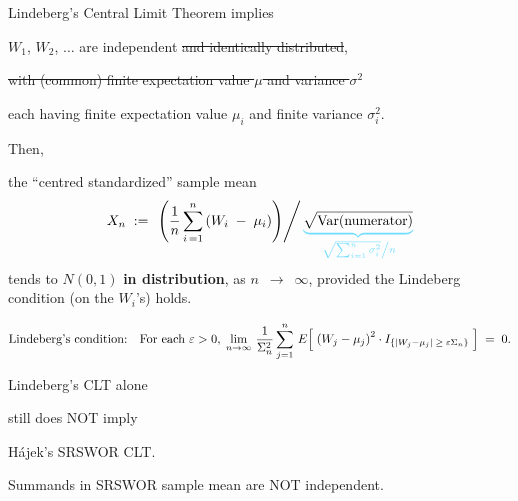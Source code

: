 \begin{frame}{\LARGE Lindeberg's Central Limit Theorem {\large\color{gcblue}implies}}

$W_{1}$, \;$W_{2}$, \;$\ldots$\; are independent {\color{faintblue}\sout{and identically distributed}},

{\color{faintblue}\sout{with (common) finite expectation value $\mu$ and variance $\sigma^{2}$}}

each having finite expectation value $\mu_{i}$ and finite variance $\sigma_{i}^{2}$.

\vskip 0.2cm
Then,
\large
\begin{center}
the ``centred standardized'' sample mean
\begin{equation*}
	X_{n} \;:=\;
	\left.\left(\dfrac{1}{n}\,\overset{n}{\underset{i\,=1}{\sum}}\,(W_{i}\;-\;\mu_{i})\right)\right\slash
	{\color{faintblue}
		\underset
			{\left.\sqrt{\sum_{i=1}^{n}\sigma_{i}^{2}}\right\slash n}
			{\underbrace{\color{black}\sqrt{\Var(\textnormal{numerator})}}}
	}
\end{equation*}
\vskip -0.2cm
tends to $N(0,1)$ {\color{gcblue}\textbf{in distribution}},\; as \;$n$ \,$\longrightarrow$\, $\infty$,
\vskip 0.1cm
provided \pause the {\color{red}Lindeberg condition} (on the $W_{i}$'s) holds.
\end{center}

\vskip -0.1cm
{\tiny\color{faintred}
\begin{equation*}
\textnormal{Lindeberg's condition:}
\quad
\textnormal{For each $\varepsilon > 0$},
\;
\lim_{n\rightarrow\infty}\,
\dfrac{1}{\Sigma^{2}_{n}}
\sum_{j=1}^{n}\,
E\!\left[\;
\left(W_{j} - \mu_{j}\right)^{2}
\cdot
I_{\left\{\left\vert W_{j} - \mu_{j}\right\vert \;\geq\; \varepsilon \Sigma_{n}\right\}}
\;\right]
\;=\;
0.
\end{equation*}
}

\end{frame}
\normalsize

\begin{frame}{\LARGE}

{\Huge
\begin{center}
Lindeberg's CLT alone

\vskip 0.2cm
still does NOT imply

\vskip 0.2cm
H\'{a}jek's SRSWOR CLT.

\vskip 0.2cm
{\normalsize\color{red}Summands in SRSWOR sample mean are NOT independent.}
\end{center}
}

\end{frame}
\normalsize

